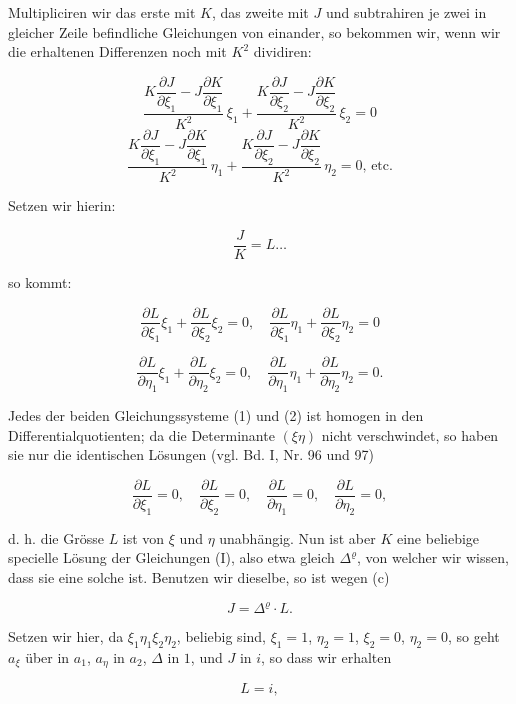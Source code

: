 Multipliciren wir das erste mit $K$, das zweite mit $J$ und subtrahiren je zwei in gleicher Zeile befindliche Gleichungen von einander, so bekommen wir, wenn wir die erhaltenen Differenzen noch mit $K^2$ dividiren:

\[
\frac{K\dfrac{\partial J}{\partial \xi_1}-J\dfrac{\partial K}{\partial \xi_1}}{K^2}\,\xi_1+\frac{K\dfrac{\partial J}{\partial \xi_2}-J\dfrac{\partial K}{\partial \xi_2}}{K^2}\,\xi_2=0
\]
\[
\frac{K\dfrac{\partial J}{\partial \xi_1}-J\dfrac{\partial K}{\partial \xi_1}}{K^2}\,\eta_1+\frac{K\dfrac{\partial J}{\partial \xi_2}-J\dfrac{\partial K}{\partial \xi_2}}{K^2}\,\eta_2=0\text{, etc.}
\]

Setzen wir hierin:

\[
\frac{J}{K} = L\ldots \tag{c}
\]

so kommt:

\[
\frac{\partial L}{\partial \xi_1}\xi_1+\frac{\partial L}{\partial \xi_2}\xi_2=0,\quad \frac{\partial L}{\partial \xi_1}\eta_1+\frac{\partial L}{\partial \xi_2}\eta_2=0 \tag{1}
\]

\[
\frac{\partial L}{\partial \eta_1}\xi_1+\frac{\partial L}{\partial \eta_2}\xi_2=0,\quad \frac{\partial L}{\partial \eta_1}\eta_1+\frac{\partial L}{\partial \eta_2}\eta_2=0. \tag{2}
\]

Jedes der beiden Gleichungssysteme (1) und (2) ist homogen in den Differentialquotienten; da die Determinante $(\xi\eta)$ nicht verschwindet, so haben sie nur die identischen Lösungen (vgl. Bd. I, Nr. 96 und 97)

\[
\frac{\partial L}{\partial \xi_1}=0,\quad \frac{\partial L}{\partial \xi_2}=0,\quad \frac{\partial L}{\partial \eta_1}=0,\quad \frac{\partial L}{\partial \eta_2}=0,
\]

d. h. die Grösse $L$ ist von $\xi$ und $\eta$ unabhängig. Nun ist aber $K$ eine beliebige specielle Lösung der Gleichungen (I), also etwa gleich $\Delta^\varrho$, von welcher wir wissen, dass sie eine solche ist. Benutzen wir dieselbe, so ist wegen (c)

\[
J = \Delta^\varrho \cdot L.
\]


Setzen wir hier, da $\xi_1\eta_1\xi_2\eta_2$, beliebig sind, $\xi_1=1$, $\eta_2=1$, $\xi_2=0$, $\eta_2=0$, so geht $a_\xi$ über in $a_1$, $a_\eta$ in $a_2$, $\Delta$ in $1$, und $J$ in $i$, so dass wir erhalten

\[
L = i,
\]

